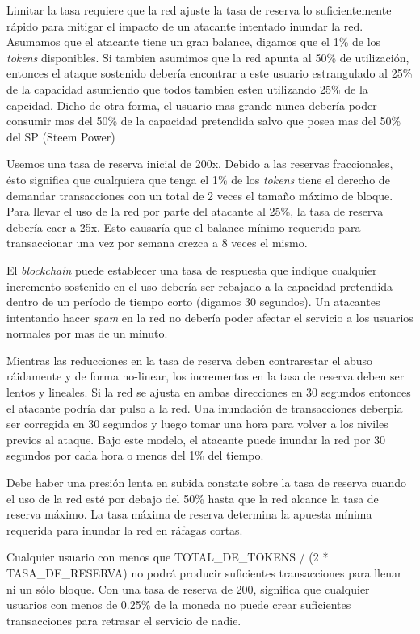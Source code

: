 \documentclass[a4paper,titlepage,final]{article}
\begin{document}
Limitar la tasa requiere que la red ajuste la tasa de reserva lo suficientemente rápido para mitigar el impacto de un atacante intentado inundar la red. Asumamos que el atacante tiene un gran balance, digamos que el 1\% de los \textit{tokens} disponibles. Si tambien asumimos que la red apunta al 50\% de utilización, entonces el ataque sostenido debería encontrar a este usuario estrangulado al 25\% de la capacidad asumiendo que todos tambien esten utilizando 25\% de la capcidad. Dicho de otra forma, el usuario mas grande nunca debería poder consumir mas del 50\% de la capacidad pretendida salvo que posea mas del 50\% del SP (Steem Power)

Usemos una tasa de reserva inicial de 200x. Debido a las reservas fraccionales, ésto significa que cualquiera que tenga el 1\% de los \textit{tokens} tiene el derecho de demandar transacciones con un total de 2 veces el tamaño máximo de bloque. Para llevar el uso de la red por parte del atacante al 25\%, la tasa de reserva debería caer a 25x. Esto causaría que el balance mínimo requerido para transaccionar una vez por semana crezca a 8 veces el mismo.

El \textit{blockchain} puede establecer una tasa de respuesta que indique cualquier incremento sostenido en el uso debería ser rebajado a la capacidad pretendida dentro de un período de tiempo corto (digamos 30 segundos). Un atacantes intentando hacer \textit{spam} en la red no debería poder afectar el servicio a los usuarios normales por mas de un minuto.

Mientras las reducciones en la tasa de reserva deben contrarestar el abuso ráidamente y de forma no-linear, los incrementos en la tasa de reserva deben ser lentos y lineales. Si la red se ajusta en ambas direcciones en 30 segundos entonces el atacante podría dar pulso a la red. Una inundación de transacciones deberpia ser corregida en 30 segundos y luego tomar una hora para volver a los niviles previos al ataque. Bajo este modelo, el atacante puede inundar la red por 30 segundos por cada hora o menos del 1\% del tiempo.

Debe haber una presión lenta en subida constate sobre la tasa de reserva cuando el uso de la red esté por debajo del 50\% hasta que la red alcance la tasa de reserva máximo. La tasa máxima de reserva determina la apuesta mínima requerida para inundar la red en ráfagas cortas.

Cualquier usuario con menos que TOTAL\_DE\_TOKENS / (2 * TASA\_DE\_RESERVA) no podrá producir suficientes transacciones para llenar ni un sólo bloque. Con una tasa de reserva de 200, significa que cualquier usuarios con menos de 0.25\% de la moneda no puede crear suficientes transacciones para retrasar el servicio de nadie.
\end{document}
